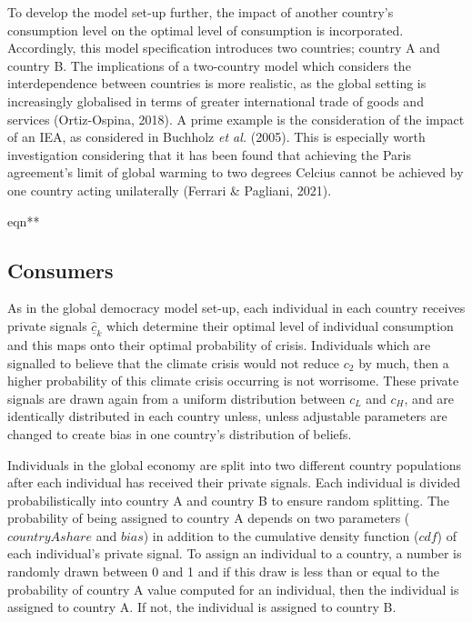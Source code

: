 \documentclass[11pt,preprint, authoryear]{elsarticle}
\numberwithin{equation}{section}
\numberwithin{figure}{section}
\numberwithin{table}{section}
\begin{document}
To develop the model set-up further, the impact of another country's
consumption level on the optimal level of consumption is incorporated.
Accordingly, this model specification introduces two countries; country
A and country B. The implications of a two-country model which considers
the interdependence between countries is more realistic, as the global
setting is increasingly globalised in terms of greater international
trade of goods and services (Ortiz-Ospina, 2018). A prime example is the
consideration of the impact of an IEA, as considered in Buchholz
\emph{et al.} (2005). This is especially worth investigation considering
that it has been found that achieving the Paris agreement's limit of
global warming to two degrees Celcius cannot be achieved by one country
acting unilaterally (Ferrari \& Pagliani, 2021).

eqn**

\hypertarget{consumers}{%
\subsection*{Consumers}\label{consumers}}

As in the global democracy model set-up, each individual in each country
receives private signals \(\hat{\underline{c}}_k\) which determine their
optimal level of individual consumption and this maps onto their optimal
probability of crisis. Individuals which are signalled to believe that
the climate crisis would not reduce \(c_2\) by much, then a higher
probability of this climate crisis occurring is not worrisome. These
private signals are drawn again from a uniform distribution between
\(c_L\) and \(c_H\), and are identically distributed in each country
unless, unless adjustable parameters are changed to create bias in one
country's distribution of beliefs.

Individuals in the global economy are split into two different country
populations after each individual has received their private signals.
Each individual is divided probabilistically into country A and country
B to ensure random splitting. The probability of being assigned to
country A depends on two parameters (\(countryAshare\) and \(bias\)) in
addition to the cumulative density function (\(cdf\)) of each
individual's private signal. To assign an individual to a country, a
number is randomly drawn between 0 and 1 and if this draw is less than
or equal to the probability of country A value computed for an
individual, then the individual is assigned to country A. If not, the
individual is assigned to country B.
\end{document}

